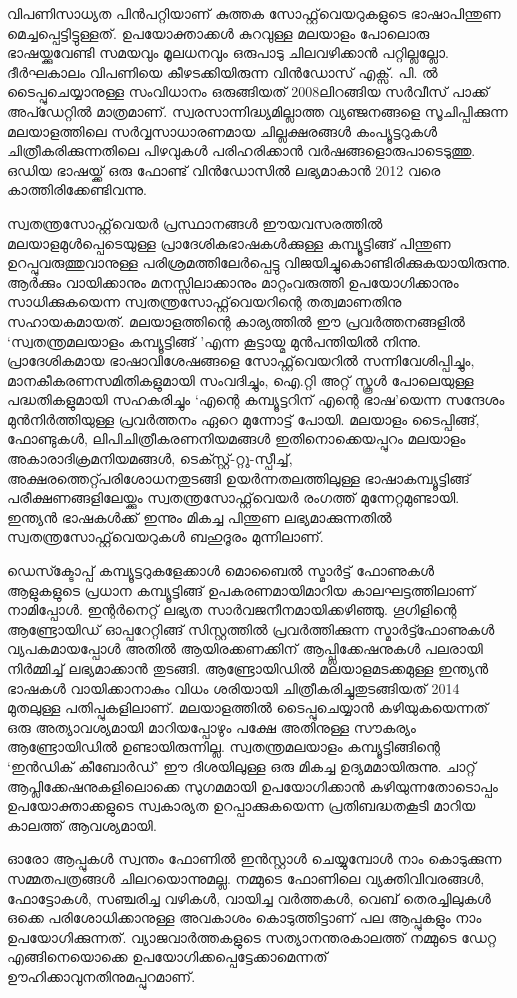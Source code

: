 \documentclass[12pt,twoside,a4paper]{article}
\begin{document}
വിപണിസാധ്യത പിൻപറ്റിയാണ് കുത്തക സോഫ്റ്റ്‌വെയറുകളുടെ ഭാഷാപിന്തുണ മെച്ചപ്പെട്ടിട്ടുള്ളത്. ഉപയോക്താക്കൾ കുറവുള്ള മലയാളം പോലൊരു ഭാഷയ്ക്കുവേണ്ടി സമയവും മൂലധനവും ഒരുപാടു ചിലവഴിക്കാൻ പറ്റില്ലല്ലോ. ദീർഘകാലം വിപണിയെ കീഴടക്കിയിരുന്ന വിൻഡോസ് എക്സ്. പി. ൽ  ടൈപ്പുചെയ്യാനുള്ള സംവിധാനം ഒരുങ്ങിയത് 2008ലിറങ്ങിയ സർവീസ് പാക്ക് അപ്ഡേറ്റിൽ മാത്രമാണ്. സ്വരസാന്നിദ്ധ്യമില്ലാത്ത വ്യഞ്ജനങ്ങളെ സൂചിപ്പിക്കുന്ന മലയാളത്തിലെ സർവ്വസാധാരണമായ ചില്ലക്ഷരങ്ങൾ കംപ്യൂട്ടറുകൾ ചിത്രീകരിക്കുന്നതിലെ പിഴവുകൾ പരിഹരിക്കാൻ വർഷങ്ങളൊരുപാടെടുത്തു. ഒഡിയ ഭാഷയ്ക്ക് ഒരു ഫോണ്ട് വിൻഡോസിൽ ലഭ്യമാകാൻ 2012 വരെ കാത്തിരിക്കേണ്ടിവന്നു.

സ്വതന്ത്രസോഫ്റ്റ്‌വെയർ പ്രസ്ഥാനങ്ങൾ ഈയവസരത്തിൽ മലയാളമുൾപ്പെടെയുള്ള പ്രാദേശികഭാഷകൾക്കുള്ള കമ്പ്യൂട്ടിങ്ങ് പിന്തുണ ഉറപ്പുവരുത്തുവാനുള്ള പരിശ്രമത്തിലേർപ്പെട്ടു വിജയിച്ചുകൊണ്ടിരിക്കുകയായിരുന്നു. ആർക്കും വായിക്കാനും മനസ്സിലാക്കാനും മാറ്റംവരുത്തി ഉപയോഗിക്കാനും സാധിക്കുകയെന്ന സ്വതന്ത്രസോഫ്റ്റ്‌വെയറിന്റെ തത്വമാണതിനു സഹായകമായത്. മലയാളത്തിന്റെ കാര്യത്തിൽ ഈ പ്രവർത്തനങ്ങളിൽ `സ്വതന്ത്രമലയാളം കമ്പ്യൂട്ടിങ്ങ് 'എന്ന കൂട്ടായ്മ മുൻപന്തിയിൽ നിന്നു. പ്രാദേശികമായ ഭാഷാവിശേഷങ്ങളെ സോഫ്റ്റ്‌വെയറിൽ സന്നിവേശിപ്പിച്ചും, മാനകീകരണസമിതികളുമായി സംവദിച്ചും, ഐ.റ്റി അറ്റ് സ്കൂൾ പോലെയുള്ള പദ്ധതികളുമായി സഹകരിച്ചും  `എന്റെ കമ്പ്യൂട്ടറിന് എന്റെ ഭാഷ'യെന്ന സന്ദേശം മുൻനിർത്തിയുള്ള പ്രവർത്തനം ഏറെ മുന്നോട്ട് പോയി. മലയാളം ടൈപ്പിങ്ങ്, ഫോണ്ടുകൾ, ലിപിചിത്രീകരണനിയമങ്ങൾ ഇതിനൊക്കെയപ്പുറം മലയാളം അകാരാദിക്രമനിയമങ്ങൾ, ടെക്സ്റ്റ്-റ്റു-സ്പീച്ച്, അക്ഷരത്തെറ്റ്പരിശോധനതുടങ്ങി ഉയർന്നതലത്തിലുള്ള ഭാഷാകമ്പ്യൂട്ടിങ്ങ് പരീക്ഷണങ്ങളിലേയ്ക്കും സ്വതന്ത്രസോഫ്റ്റ്‌വെയർ രംഗത്ത് മുന്നേറ്റമുണ്ടായി. ഇന്ത്യൻ ഭാഷകൾക്ക് ഇന്നും മികച്ച പിന്തുണ ലഭ്യമാക്കുന്നതിൽ സ്വതന്ത്രസോഫ്റ്റ്‌വെയറുകൾ ബഹുദൂരം മുന്നിലാണ്.

ഡെസ്ക്ടോപ്പ് കമ്പ്യൂട്ടറുകളേക്കാൾ മൊബൈൽ സ്മാർട്ട് ഫോണുകൾ ആളുകളുടെ പ്രധാന കമ്പ്യൂട്ടിങ്ങ് ഉപകരണമായിമാറിയ കാലഘട്ടത്തിലാണ് നാമിപ്പോൾ. ഇന്റർനെറ്റ് ലഭ്യത സാർവജനീനമായിക്കഴിഞ്ഞു. ഗൂഗിളിന്റെ ആണ്ട്രോയിഡ് ഓപ്പറേറ്റിങ്ങ് സിസ്റ്റത്തിൽ പ്രവർത്തിക്കുന്ന സ്മാർട്ട്ഫോണുകൾ വ്യപകമായപ്പോൾ അതിൽ ആയിരക്കണക്കിന് ആപ്പ്ലിക്കേഷനുകൾ പലരായി നിർമ്മിച്ച് ലഭ്യമാക്കാൻ തുടങ്ങി. ആണ്ട്രോയിഡിൽ മലയാളമടക്കമുള്ള ഇന്ത്യൻ ഭാഷകൾ വായിക്കാനാകും വിധം ശരിയായി ചിത്രീകരിച്ചുതുടങ്ങിയത് 2014 മുതലുള്ള പതിപ്പുകളിലാണ്. മലയാളത്തിൽ ടൈപ്പുചെയ്യാൻ കഴിയുകയെന്നത് ഒരു അത്യാവശ്യമായി മാറിയപ്പോഴും പക്ഷേ അതിനുള്ള സൗകര്യം ആണ്ട്രോയിഡിൽ ഉണ്ടായിരുന്നില്ല. സ്വതന്ത്രമലയാളം കമ്പ്യൂട്ടിങ്ങിന്റെ `ഇൻഡിക് കീബോർഡ്' ഈ ദിശയിലുള്ള ഒരു  മികച്ച ഉദ്യമമായിരുന്നു. ചാറ്റ് ആപ്ലിക്കേഷനുകളിലൊക്കെ സുഗമമായി ഉപയോഗിക്കാൻ കഴിയുന്നതോടൊപ്പം ഉപയോക്താക്കളുടെ സ്വകാര്യത ഉറപ്പാക്കുകയെന്ന പ്രതിബദ്ധതകൂടി മാറിയ കാലത്ത് ആവശ്യമായി.

ഓരോ ആപ്പുകൾ സ്വന്തം ഫോണിൽ ഇൻസ്റ്റാൾ ചെയ്യുമ്പോൾ നാം കൊടുക്കുന്ന സമ്മതപത്രങ്ങൾ ചിലറയൊന്നുമല്ല. നമ്മുടെ ഫോണിലെ വ്യക്തിവിവരങ്ങൾ, ഫോട്ടോകൾ, സഞ്ചരിച്ച വഴികൾ, വായിച്ച വർത്തകൾ, വെബ് തെരച്ചിലുകൾ ഒക്കെ പരിശോധിക്കാനുള്ള അവകാശം കൊടുത്തിട്ടാണ് പല ആപ്പുകളും നാം ഉപയോഗിക്കുന്നത്.  വ്യാജവാർത്തകളുടെ സത്യാനന്തരകാലത്ത്  നമ്മുടെ ഡേറ്റ എങ്ങിനെയൊക്കെ ഉപയോഗിക്കപ്പെട്ടേക്കാമെന്നത് ഊഹിക്കാവുനതിനുമപ്പുറമാണ്. 
\end{document}
